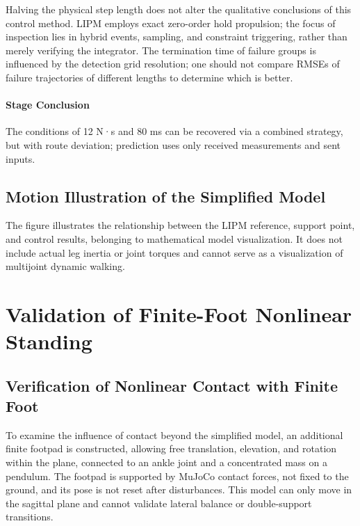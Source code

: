 Halving the physical step length does not alter the qualitative conclusions of this control method. LIPM employs exact zero-order hold propulsion; the focus of inspection lies in hybrid events, sampling, and constraint triggering, rather than merely verifying the integrator. The termination time of failure groups is influenced by the detection grid resolution; one should not compare RMSEs of failure trajectories of different lengths to determine which is better.


\paragraph{Stage Conclusion} The conditions of 12 N·s and 80 ms can be recovered via a combined strategy, but with route deviation; prediction uses only received measurements and sent inputs.



\subsection{Motion Illustration of the Simplified Model}
The figure illustrates the relationship between the LIPM reference, support point, and control results, belonging to mathematical model visualization. It does not include actual leg inertia or joint torques and cannot serve as a visualization of multijoint dynamic walking.



\FloatBarrier

\section{Validation of Finite-Foot Nonlinear Standing}

\label{stage:s19}

\subsection{Verification of Nonlinear Contact with Finite Foot} \label{s19-detail-1}

To examine the influence of contact beyond the simplified model, an additional finite footpad is constructed, allowing free translation, elevation, and rotation within the plane, connected to an ankle joint and a concentrated mass on a pendulum. The footpad is supported by MuJoCo contact forces, not fixed to the ground, and its pose is not reset after disturbances. This model can only move in the sagittal plane and cannot validate lateral balance or double-support transitions.


